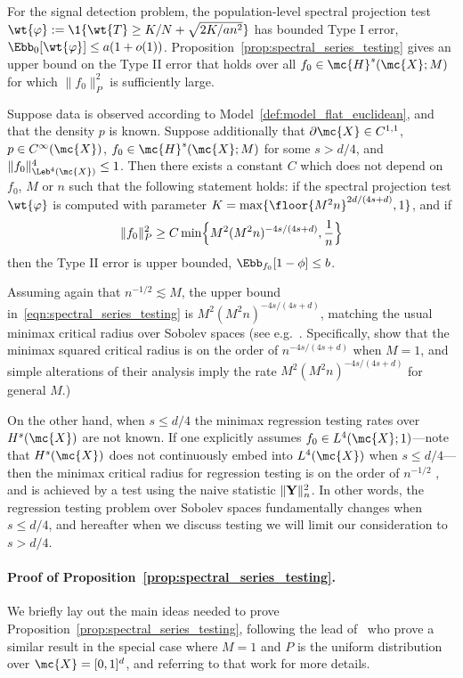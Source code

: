 For the signal detection problem, the population-level spectral projection test $\wt{\varphi} := \1\{\wt{T} \geq K/N + \sqrt{2K/an^2}\}$ has bounded Type I error, $\Ebb_{0}[\wt{\varphi}] \leq a (1 + o(1))$. Proposition~\ref{prop:spectral_series_testing} gives an upper bound on the Type II error that holds over all $f_0 \in \mc{H}^s(\mc{X};M)$ for which $\|f_0\|_P^2$ is sufficiently large.
\begin{proposition}
	\label{prop:spectral_series_testing}
	Suppose data is observed according to Model~\ref{def:model_flat_euclidean}, and that the density $p$ is known.  Suppose additionally that $\partial \mc{X} \in C^{1,1}$, $p \in C^{\infty}(\mc{X})$, $f_0 \in \mc{H}^{s}(\mc{X};M)$ for some $s > d/4$, and $\|f_0\|_{\Leb^4(\mc{X})}^4 \leq 1$. Then there exists a constant $C$ which does not depend on $f_0$, $M$ or $n$ such that the following statement holds: if the spectral projection test $\wt{\varphi}$ is computed with parameter $K = \max\{\floor{M^2n}^{2d/(4s + d)},1\}$, and if
	\begin{equation}
	\label{eqn:spectral_series_testing}
	\|f_0\|_P^2 \geq C\min\Bigl\{M^2(M^2n)^{-4s/(4s + d)}, \frac{1}{n}\Bigr\}
	\end{equation}
	then the Type II error is upper bounded, $\Ebb_{f_0}[1 - \phi] \leq b$.
\end{proposition}
Assuming again that $n^{-1/2} \lesssim M$, the upper bound in~\eqref{eqn:spectral_series_testing} is $M^2(M^2n)^{-4s/(4s + d)}$, matching the usual minimax critical radius over Sobolev spaces (see e.g.~\cite{guerre02,ingster2009,ingster2012}. Specifically, \cite{ingster2009} show that the minimax squared critical radius is on the order of $n^{-4s/(4s + d)}$ when $M = 1$, and simple alterations of their analysis imply the rate $M^2(M^2n)^{-4s/(4s + d)}$ for general $M$.) 

On the other hand, when $s \leq d/4$ the minimax regression testing rates over $H^s(\mc{X})$ are not known. If one explicitly assumes $f_0 \in L^4(\mc{X};1)$---note that $H^s(\mc{X})$ does not continuously embed into $L^4(\mc{X})$ when $s \leq d/4$---then the minimax critical radius for regression testing is on the order of $n^{-1/2}$ \citep{guerre02}, and is achieved by a test using the naive statistic $\|{\bf Y}\|_n^2$. In other words, the regression testing problem over Sobolev spaces fundamentally changes when $s \leq d/4$, and hereafter when we discuss testing we will limit our consideration to $s > d/4$. 
\paragraph{Proof of Proposition~\ref{prop:spectral_series_testing}.}
We briefly lay out the main ideas needed to prove Proposition~\ref{prop:spectral_series_testing}, following the lead of~\cite{ingster2009} who prove a similar result in the special case where $M = 1$ and $P$ is the uniform distribution over $\mc{X} = [0,1]^d$, and referring to that work for more details.

